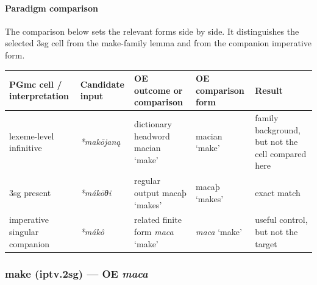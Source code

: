 \documentclass[
  british,
  a4paper,
]{article}
\newcounter{none} %
\begin{document}
\paragraph{Paradigm comparison}\label{paradigm-comparison-13}

The comparison below sets the relevant forms side by side. It
distinguishes the selected 3sg cell from the make-family lemma and from
the companion imperative form.

{\def\LTcaptype{none} %
\begin{longtable}[]{@{}
  >{\raggedright\arraybackslash}p{}
  >{\raggedright\arraybackslash}p{}
  >{\raggedright\arraybackslash}p{}
  >{\raggedright\arraybackslash}p{}
  >{\raggedright\arraybackslash}p{}@{}}
\toprule\noalign{}
\begin{minipage}[b]{\linewidth}\raggedright
PGmc cell / interpretation
\end{minipage} & \begin{minipage}[b]{\linewidth}\raggedright
Candidate input
\end{minipage} & \begin{minipage}[b]{\linewidth}\raggedright
OE outcome or comparison
\end{minipage} & \begin{minipage}[b]{\linewidth}\raggedright
OE comparison form
\end{minipage} & \begin{minipage}[b]{\linewidth}\raggedright
Result
\end{minipage} \\
\midrule\noalign{}
\endhead
\bottomrule\noalign{}
\endlastfoot
lexeme-level infinitive & {\emph{*makōjaną}} & dictionary headword
{macian} `make' & {macian} `make' & family background, but not the cell
compared here \\
3sg present & {\emph{*mákōθi}} & regular output {macaþ} `makes' &
{macaþ} `makes' & exact match \\
imperative singular companion & {\emph{*mákô}} & related finite form
{\emph{maca}} `make' & {\emph{maca}} `make' & useful control, but not
the target \\
\end{longtable}
}

\subsubsection{\texorpdfstring{make (iptv.2sg) --- OE
\emph{maca}}{make (iptv.2sg) --- OE maca}}\label{make-iptv.2sg-oe-maca}
\end{document}
